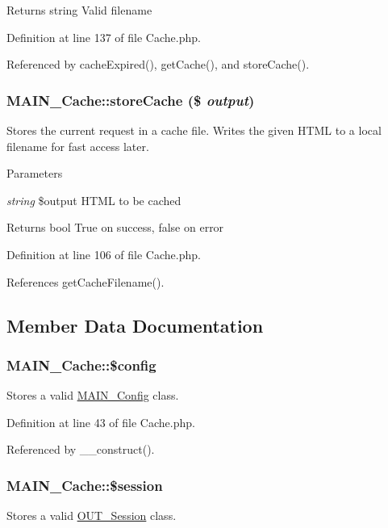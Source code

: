 \begin{DoxyReturn}{Returns}
string Valid filename 
\end{DoxyReturn}


Definition at line 137 of file Cache.php.

Referenced by cacheExpired(), getCache(), and storeCache().\hypertarget{classMAIN__Cache_a146320476b10d9bd545fb492ec929276}{
\subsubsection[{storeCache}]{\setlength{\rightskip}{0pt plus 5cm}MAIN\_\-Cache::storeCache (\$ {\em output})}}
\label{d2/d41/classMAIN__Cache_a146320476b10d9bd545fb492ec929276}
Stores the current request in a cache file. Writes the given HTML to a local filename for fast access later.


\begin{DoxyParams}{Parameters}
\item[{\em string}]\$output HTML to be cached\end{DoxyParams}
\begin{DoxyReturn}{Returns}
bool True on success, false on error 
\end{DoxyReturn}


Definition at line 106 of file Cache.php.

References getCacheFilename().

\subsection{Member Data Documentation}
\hypertarget{classMAIN__Cache_a9e10bcda14432aaed68c259151ec2070}{
\subsubsection[{\$config}]{\setlength{\rightskip}{0pt plus 5cm}MAIN\_\-Cache::\$config}}
\label{d2/d41/classMAIN__Cache_a9e10bcda14432aaed68c259151ec2070}
Stores a valid \hyperlink{classMAIN__Config}{MAIN\_\-Config} class. 

Definition at line 43 of file Cache.php.

Referenced by \_\-\_\-construct().\hypertarget{classMAIN__Cache_ad1ffa30f8ad4128b1a1fdaec2d60d7df}{
\subsubsection[{\$session}]{\setlength{\rightskip}{0pt plus 5cm}MAIN\_\-Cache::\$session}}
\label{d2/d41/classMAIN__Cache_ad1ffa30f8ad4128b1a1fdaec2d60d7df}
Stores a valid \hyperlink{classOUT__Session}{OUT\_\-Session} class. 

